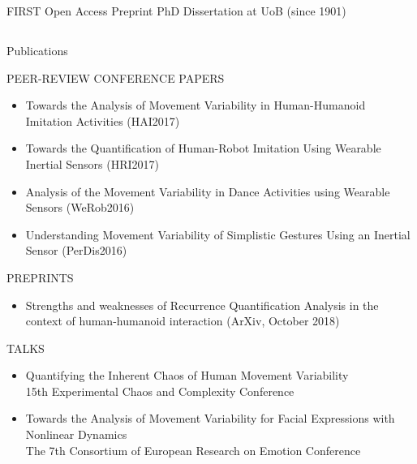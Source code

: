 {{\begin{frame}{FIRST Open Access Preprint PhD 
		Dissertation at UoB (since 1901)}
    \begin{figure}
   \end{figure}
	
\end{frame}
}





\subsection{}
{

\begin{frame}{Publications}

\tiny
 
PEER-REVIEW CONFERENCE PAPERS
\begin{itemize}	
	\item Towards the Analysis of Movement Variability in Human-Humanoid Imitation Activities 
	(HAI2017) 
	\item Towards the Quantification of Human-Robot Imitation Using Wearable Inertial Sensors (HRI2017)
	\item Analysis of the Movement Variability in Dance Activities using Wearable Sensors (WeRob2016)
	\item Understanding Movement Variability of Simplistic Gestures Using an Inertial Sensor (PerDis2016)
\end{itemize}

PREPRINTS 
\begin{itemize}	
	\item Strengths and weaknesses of Recurrence Quantification Analysis in the context of human-humanoid interaction
	(ArXiv, October 2018)
\end{itemize}

TALKS 
\begin{itemize}	
	\item Quantifying the Inherent Chaos of Human Movement Variability \\
	15th Experimental Chaos and Complexity Conference 
	\item Towards the Analysis of Movement Variability for Facial Expressions with
	Nonlinear Dynamics \\
	The 7th Consortium of European Research on Emotion Conference 
\end{itemize}



\end{frame}}}
